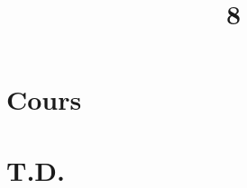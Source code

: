 \documentclass[a4paper]{article}
\title{8}{Intégrales à paramètre}
\begin{document}
	\part{Cours}
	
	
	\clearpage\null\clearpage
	\renewcommand{\thesection}{}
	\renewcommand{\thesubsection}{}
	\part{T.D.}
	
	
\end{document}
